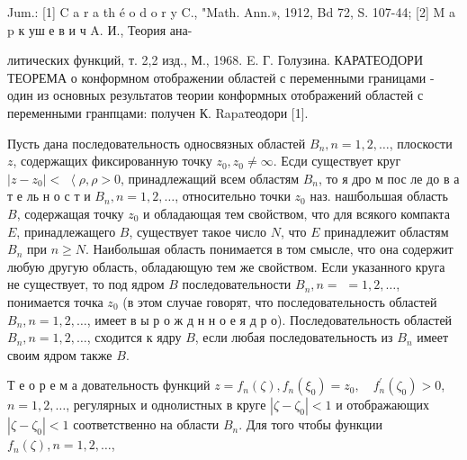 \documentclass[10pt]{article}
\begin{document}
Jum.: [1] C a r a th é o d o r y C., "Math. Ann.», 1912, Bd 72, S. 107-44; [2] M a p к уш е в и ч A. И., Теория ана-

литических функций, т. 2,2 изд., М., 1968. E. Г. Голузина. КАРАТЕОДОРИ ТЕОРЕМА о конформном отображении областей с переменными границами - один из основных результатов теории конформных отображений областей с переменными гранпцами: получен К. Rapaтеодори [1].



Пусть дана последовательность односвязных областей $B_{n}, n=1,2, \ldots$, плоскости $z$, содержащих фиксированную точку $z_{0}, z_{0} \neq \infty$. Есди существует круг $\left|z-z_{0}\right|<$ $\left\langle\rho, \rho>0\right.$, принадлежащий всем областям $B_{n}$, то я дро м пос ле до в а т е ль н о с т и $B_{n}, n=1,2, \ldots$, относительно точки $z_{0}$ наз. нашбольшая область $B$, содержащая точку $z_{0}$ и обладающая тем свойством, что для всякого компакта $E$, принадлежащего $B$, существует такое число $N$, что $E$ принадлежит областям $B_{n}$ при $n \geqslant N$. Наибольшая область понимается в том смысле, что она содержит любую другую область, обладающую тем же свойством. Если указанного круга не существует, то под ядром $B$ последовательности $B_{n}, n=$ $=1,2, \ldots$, понимается точка $z_{0}$ (в этом случае говорят, что последовательность областей $B_{n}, n=1,2, \ldots$, имеет в ы р о ж д н н о е я д р о). Последовательность областей $B_{n}, n=1,2, \ldots$, сходится к ядру $B$, если любая последовательность из $B_{n}$ имеет своим ядром также $B$.



Т е о р е м а довательность функций $z=f_{n}(\zeta), f_{n}\left(\xi_{0}\right)=z_{0}, \quad f_{n}^{\prime}\left(\zeta_{0}\right)>0$, $n=1,2, \ldots$, регулярных и однолистных в круге $\left|\zeta-\zeta_{0}\right|<1$ и отображающих $\left|\zeta-\zeta_{0}\right|<1$ соответственно на области $B_{n}$. Для того чтобы функции $f_{n}(\zeta), n=1,2, \ldots$,
\end{document}
